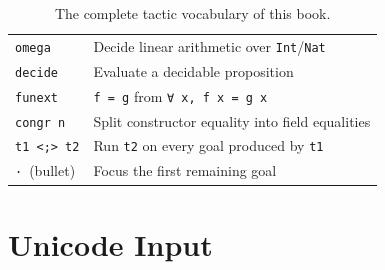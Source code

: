 \documentclass[12pt, a4paper, openright]{book}
\theoremstyle{thmstyle}
\theoremstyle{defstyle}
\newcommand{\lc}[1]{\texttt{#1}}
\begin{document}
\begin{table}[H]
\begin{tabular}{ll}
    \lc{omega}        & Decide linear arithmetic over \lc{Int}/\lc{Nat} \\
    \lc{decide}       & Evaluate a decidable proposition \\
    \lc{funext}       & \lc{f = g} from \lc{∀ x, f x = g x} \\
    \lc{congr n}      & Split constructor equality into field equalities \\
    \lc{t1 <;> t2}    & Run \lc{t2} on every goal produced by \lc{t1} \\
    \lc{·}~(bullet)   & Focus the first remaining goal \\
    \bottomrule
  \end{tabular}
  \caption{The complete tactic vocabulary of this book.}
\end{table}

\section{Unicode Input}
\end{document}
